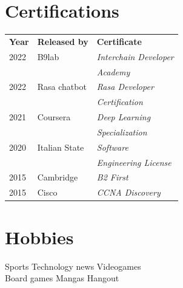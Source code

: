 \documentclass[]{deedy-resume-openfont}
\begin{document}
\begin{minipage}[t]{0.33\textwidth}
\section{Certifications}
\begin{tabular}{@{}lll@{}}
\textbf{Year} & \textbf{Released by} & \textbf{Certificate} \\
2022          & B9lab         & \textit{Interchain Developer} \\
              &               & \textit{Academy} \\
2022          & Rasa chatbot  & \textit{Rasa Developer} \\
              &               & \textit{Certification} \\
2021          & Coursera      & \textit{Deep Learning} \\
              &               & \textit{Specialization} \\
2020          & Italian State & \textit{Software}\\
              &               & \textit{Engineering License} \\
2015	      & Cambridge     & \textit{B2 First} \\
2015	      & Cisco         & \textit{CCNA Discovery} \\
\end{tabular}
\sectionsep


\section{Hobbies}
Sports \textbullet{} Technology news \textbullet{} Videogames \\
Board games \textbullet{} Mangas \textbullet{} Hangout

%
%

\end{minipage}
\hfill
\end{document}
